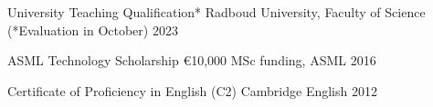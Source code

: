 

\begin{cvhonors}

  \cvhonor
    {University Teaching Qualification*} %
    {Radboud University, Faculty of Science (*Evaluation in October)} %
    {} %
    {2023} %

  \cvhonor
    {ASML Technology Scholarship} %
    {€10,000 MSc funding, ASML} %
    {} %
    {2016} %

  \cvhonor
    {Certificate of Proficiency in English (C2)} %
    {Cambridge English} %
    {} %
    {2012} %


\end{cvhonors}
